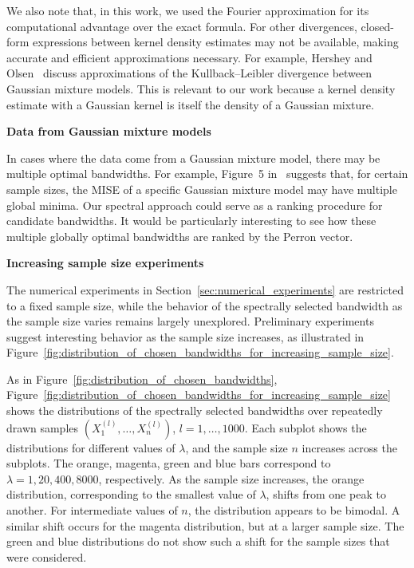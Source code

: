 We also note that, in this work, we used the Fourier approximation for its computational advantage over the exact formula. For other divergences, closed-form expressions between kernel density estimates may not be available, making accurate and efficient approximations necessary. For example, Hershey and Olsen~\cite{hershey_approximating_2007} discuss approximations of the Kullback--Leibler divergence between Gaussian mixture models. This is relevant to our work because a kernel density estimate with a Gaussian kernel is itself the density of a Gaussian mixture.

\textbf{Data from Gaussian mixture models}

In cases where the data come from a Gaussian mixture model, there may be multiple optimal bandwidths. For example, Figure~5 in~\cite{10.1214/aos/1176348653} suggests that, for certain sample sizes, the MISE of a specific Gaussian mixture model may have multiple global minima. Our spectral approach could serve as a ranking procedure for candidate bandwidths. It would be particularly interesting to see how these multiple globally optimal bandwidths are ranked by the Perron vector.

\textbf{Increasing sample size experiments}

The numerical experiments in Section~\ref{sec:numerical_experiments} are restricted to a fixed sample size, while the behavior of the spectrally selected bandwidth as the sample size varies remains largely unexplored. Preliminary experiments suggest interesting behavior as the sample size increases, as illustrated in Figure~\ref{fig:distribution_of_chosen_bandwidths_for_increasing_sample_size}. 

As in Figure~\ref{fig:distribution_of_chosen_bandwidths}, Figure~\ref{fig:distribution_of_chosen_bandwidths_for_increasing_sample_size} shows the distributions of the spectrally selected bandwidths over repeatedly drawn samples $(X_1^{(l)},\dots,X_n^{(l)})$, $l=1,\dots,1000$. Each subplot shows the distributions for different values of $\lambda$, and the sample size $n$ increases across the subplots. The orange, magenta, green and blue bars correspond to $\lambda=1,20,400,8000$, respectively. As the sample size increases, the orange distribution, corresponding to the smallest value of $\lambda$, shifts from one peak to another. For intermediate values of $n$, the distribution appears to be bimodal. A similar shift occurs for the magenta distribution, but at a larger sample size. The green and blue distributions do not show such a shift for the sample sizes that were considered.

